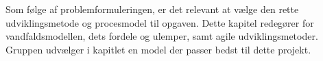 Som følge af problemformuleringen, er det relevant at vælge den rette udviklingsmetode og procesmodel til opgaven.
Dette kapitel redegører for vandfaldsmodellen, dets fordele og ulemper, samt agile udviklingsmetoder.
Gruppen udvælger i kapitlet en model der passer bedst til dette projekt.